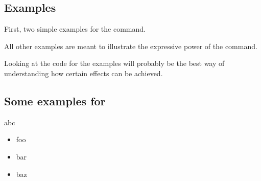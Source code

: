 \begin{slide}
  \section{Examples}\label{Sec:Ex}
  First, two simple examples for the  command.

  All other examples are meant to illustrate the expressive power of the  command.

  Looking at the code for the examples will probably be the best way of understanding how certain effects can be
  achieved.

  \newslide

  \subsection{Some examples for }
  \begin{center}
    a\pause b\pause c
  \end{center}

  \pause

  \pageTransitionDissolve
  \begin{itemize}
  \item foo\pause
  \item bar\pause
  \item baz
  \end{itemize}

  \newslide
  \pageTransitionReplace


\renewcommand{\makeslidetitle}[1]
{%
  \subsection{#1}%
}

  

  \newslide


\end{slide}
